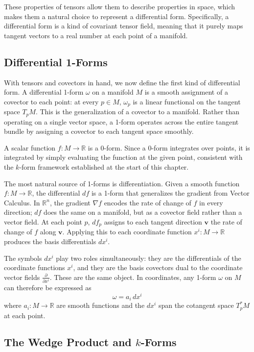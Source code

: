 \documentclass[12pt]{article}
\newcommand{\R}{\mathbb{R}}
\newcommand{\p}{\partial}
\newcommand{\bv}[1]{\mathbf{#1}}
\begin{document}
These properties of tensors allow them to describe properties in space, which makes them a natural choice to represent a differential form. Specifically, a differential form is a kind of covariant tensor field, meaning that it purely maps tangent vectors to a real number at each point of a manifold.

\subsection{Differential 1-Forms}

With tensors and covectors in hand, we now define the first kind of differential form. A differential 1-form $\omega$ on a manifold $M$ is a smooth assignment of a covector to each point: at every $p \in M$, $\omega_p$ is a linear functional on the tangent space $T_pM$. This is the generalization of a covector to a manifold. Rather than operating on a single vector space, a 1-form operates across the entire tangent bundle by assigning a covector to each tangent space smoothly.

A scalar function $f: M \to \R$ is a 0-form. Since a 0-form integrates over points, it is integrated by simply evaluating the function at the given point, consistent with the $k$-form framework established at the start of this chapter.

The most natural source of 1-forms is differentiation. Given a smooth function $f: M \to \R$, the differential $df$ is a 1-form that generalizes the gradient from Vector Calculus. In $\R^n$, the gradient $\nabla f$ encodes the rate of change of $f$ in every direction; $df$ does the same on a manifold, but as a covector field rather than a vector field. At each point $p$, $df_p$ assigns to each tangent direction $\bv{v}$ the rate of change of $f$ along $\bv{v}$. Applying this to each coordinate function $x^i: M \to \R$ produces the basis differentials $dx^i$.

The symbols $dx^i$ play two roles simultaneously: they are the differentials of the coordinate functions $x^i$, and they are the basis covectors dual to the coordinate vector fields $\frac{\p}{\p x^i}$. These are the same object. In coordinates, any 1-form $\omega$ on $M$ can therefore be expressed as
\[
\omega = a_i \, dx^i
\]
where $a_i: M \to \R$ are smooth functions and the $dx^i$ span the cotangent space $T_p^*M$ at each point.

\subsection{The Wedge Product and $k$-Forms}
\end{document}
